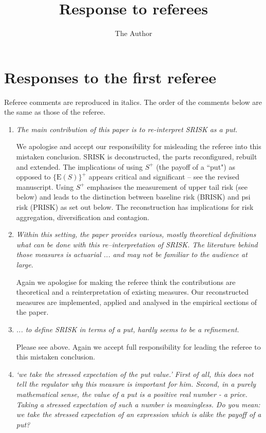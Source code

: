 \documentclass[11pt]{amsart}
\title{Response to referees}
\author{The Author}
\newcommand{\E}{{\mathrm E}}
\begin{document}
\maketitle
\section{Responses to the first referee}

Referee comments are reproduced in italics.  The order of the comments below are the same as those of the referee.

\begin{enumerate}
\item {\it The main contribution of this paper is to re-interpret SRISK as a put.}

We apologise  and accept our responsibility for misleading the referee into this mistaken conclusion.  SRISK is deconstructed, the parts  reconfigured, rebuilt and extended.    The implications of using $S^+$ (the payoff of a ``put") as opposed to $\{\E(S)\}^+$  appears critical and significant -- see the revised manuscript.  Using  $S^+$ emphasises the measurement of upper tail risk (see below) and leads to the distinction between baseline risk (BRISK) and psi risk (PRISK) as set out below.   The reconstruction has implications for risk aggregation, diversification and contagion.

\item  {\it Within this setting, the paper provides various, mostly theoretical definitions what can be done with this re--interpretation of SRISK. The literature behind those measures is actuarial ... and may not be familiar to the audience at large.}  

Again we apologise for making the referee think the contributions are theoretical and  a reinterpretation of existing measures.  Our reconstructed measures  are implemented, applied  and analysed  in the empirical sections of the paper.    

\item {\it ... to define SRISK in terms of a put, hardly seems to be a refinement.}

Please see above.  Again we accept full responsibility for leading the referee to this mistaken conclusion.

\item {\it `we take the stressed expectation of the put value.' First of all, this does not tell the regulator why this measure is important for him. Second, in a purely mathematical sense, the value of a put is a positive real number - a price. Taking a stressed expectation of such a number is meaningless. Do you mean: we take the stressed expectation of an expression which is alike the payoff of a put?}


\end{enumerate}
\end{document}
